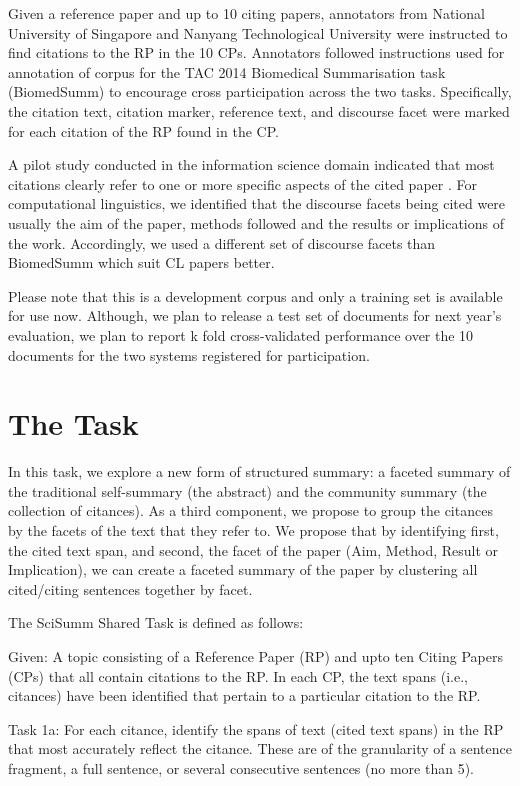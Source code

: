 \documentclass[11pt]{article}
\begin{document}
Given a reference paper and up to 10 citing papers, annotators from National 
University of Singapore and Nanyang Technological University were instructed 
to find citations to the RP in the 10 CPs. Annotators followed instructions 
used for annotation of corpus for the TAC 2014 Biomedical Summarisation task 
(BiomedSumm) to encourage cross participation across the two tasks. 
Specifically, the citation text, citation marker, reference text, and discourse 
facet were marked for each citation of the RP found in the CP.

A pilot study conducted in the information science domain indicated that most 
citations clearly refer to one or more specific aspects of the cited paper 
\cite{jaidka2013}. For computational linguistics, we identified that the discourse 
facets being cited were usually the aim of the paper, methods followed and the 
results or implications of the work. Accordingly, we used a different set of 
discourse facets than BiomedSumm which suit CL papers better.	

Please note that this is a development corpus and only a training set is 
available for use now. Although, we plan to release a test set of documents 
for next year’s evaluation, we plan to report k fold cross-validated performance 
over the 10 documents for the two systems registered for participation.

\section{The Task}
In this task, we explore a new form of structured summary: a faceted summary 
of the traditional self-summary (the abstract) and the community summary 
(the collection of citances).  As a third component, we propose to group the 
citances by the facets of the text that they refer to. We propose that by 
identifying first, the cited text span, and second, the facet of the paper 
(Aim, Method, Result or Implication), we can create a faceted summary of the 
paper by clustering all cited/citing sentences together by facet.

The SciSumm Shared Task is defined as follows:

Given: A topic consisting of a Reference Paper (RP) and upto ten Citing 
Papers (CPs) that all contain citations to the RP. In each CP, the text spans 
(i.e., citances) have been identified that pertain to a particular citation 
to the RP.

Task 1a: For each citance, identify the spans of text (cited text spans) in 
the RP that most accurately reflect the citance. These are of the granularity 
of a sentence fragment, a full sentence, or several consecutive sentences 
(no more than 5).
\end{document}
